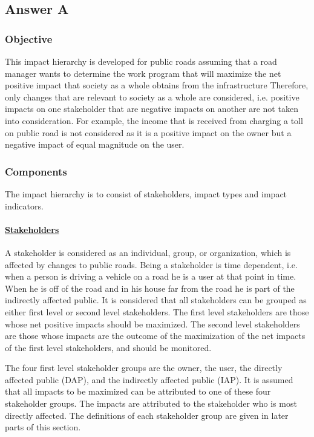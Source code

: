\subsection{Answer A}

\label{GrindEQpgref4d79f6d52}\subsubsection{Objective}

This impact hierarchy is developed for public roads assuming that a road manager wants to determine the work program that will maximize the net positive impact that society as a whole obtains from the infrastructure Therefore, only changes that are relevant to society as a whole are considered, i.e. positive impacts on one stakeholder that are negative impacts on another are not taken into consideration. For example, the income that is received from charging a toll on public road is not considered as it is a positive impact on the owner but a negative impact of equal magnitude on the user.

\subsubsection{Components}

The impact hierarchy is to consist of stakeholders, impact types and impact indicators.


\paragraph{\underline{Stakeholders}}

A stakeholder is considered as an individual, group, or organization, which is affected by changes to public roads. Being a stakeholder is time dependent, i.e. when a person is driving a vehicle on a road he is a user at that point in time. When he is off of the road and in his house far from the road he is part of the indirectly affected public. It is considered that all stakeholders can be grouped as either first level or second level stakeholders. The first level stakeholders are those whose net positive impacts should be maximized. The second level stakeholders are those whose impacts are the outcome of the maximization of the net impacts of the first level stakeholders, and should be monitored. 

The four first level stakeholder groups are the owner, the user, the directly affected public (DAP), and the indirectly affected public (IAP). It is assumed that all impacts to be maximized can be attributed to one of these four stakeholder groups. The impacts are attributed to the stakeholder who is most directly affected. The definitions of each stakeholder group are given in later parts of this section. 

